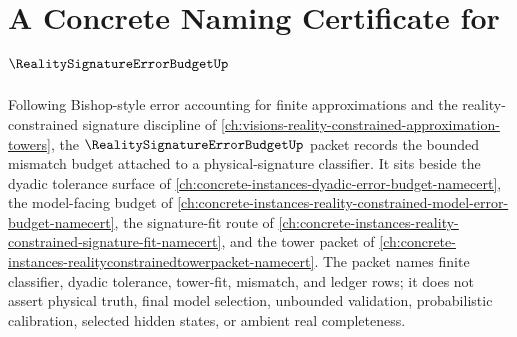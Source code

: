 \chapter{A Concrete Naming Certificate for $\RealitySignatureErrorBudgetUp$}
\label{ch:concrete-instances-reality-signature-error-budget-namecert}

Following Bishop-style error accounting for finite approximations and the reality-constrained signature discipline of \autoref{ch:visions-reality-constrained-approximation-towers}, the $\RealitySignatureErrorBudgetUp$ packet records the bounded mismatch budget attached to a physical-signature classifier. It sits beside the dyadic tolerance surface of \autoref{ch:concrete-instances-dyadic-error-budget-namecert}, the model-facing budget of \autoref{ch:concrete-instances-reality-constrained-model-error-budget-namecert}, the signature-fit route of \autoref{ch:concrete-instances-reality-constrained-signature-fit-namecert}, and the tower packet of \autoref{ch:concrete-instances-realityconstrainedtowerpacket-namecert}. The packet names finite classifier, dyadic tolerance, tower-fit, mismatch, and ledger rows; it does not assert physical truth, final model selection, unbounded validation, probabilistic calibration, selected hidden states, or ambient real completeness.

